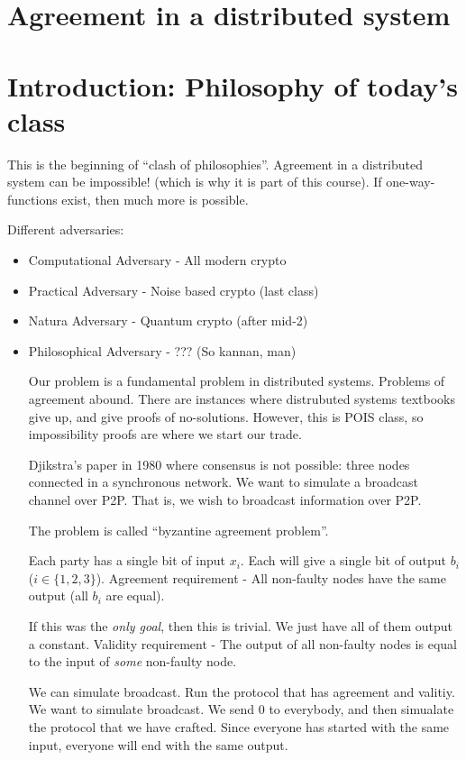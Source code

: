 \documentclass[11pt]{article}
\begin{document}
\section{Agreement in a distributed system}

\section{Introduction: Philosophy of today's class}
This is the beginning of ``clash of philosophies''.
Agreement in a distributed system can be impossible! (which is why it is part of this course).
If one-way-functions exist, then much more is possible.

Different adversaries:
\begin{itemize}
\item Computational Adversary - All modern crypto
\item Practical Adversary - Noise based crypto (last class)
\item Natura Adversary - Quantum crypto (after mid-2)
\item Philosophical Adversary - ??? (So kannan, man)

  Our problem is a fundamental problem in distributed systems. Problems of agreement abound.
  There are instances where distrubuted systems textbooks give up, and give proofs of no-solutions.
  However, this is POIS class, so impossibility proofs are where we start our trade.

  
  Djikstra's paper in 1980 where consensus is not possible: three nodes connected in a synchronous network.
  We want to simulate a broadcast channel over P2P. That is, we wish to broadcast information over P2P.

  The problem is called ``byzantine agreement problem''.

  Each party has a single bit of input $x_i$. Each will give a single bit of output $b_i$ ($i \in \{ 1, 2, 3 \}$).
  Agreement  requirement - All non-faulty nodes have the same output (all $b_i$ are equal).

  If this was the \textit{only goal}, then this is trivial. We just have all of them output a constant.
  Validity requirement - The output of all non-faulty nodes is equal to the input of \textit{some} non-faulty node.


  We can simulate broadcast. Run the protocol that has agreement and valitiy. We want to simulate broadcast. We send $0$ to everybody,
  and then simualate the protocol that we have crafted. Since everyone has started with the same input, everyone will end with the
  same output.


\end{itemize}
\end{document}
